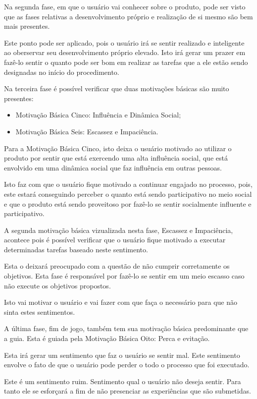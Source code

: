 Na segunda fase, em que o usuário vai conhecer sobre o produto, pode ser visto
que as fases relativas a desenvolvimento próprio e realização de si mesmo
são bem mais presentes.

Este ponto pode ser aplicado, pois o usuário irá se sentir realizado e inteligente
ao oberservar seu desenvolvimento próprio elevado. Isto irá gerar um prazer em fazê-lo
sentir o quanto pode ser bom em realizar as tarefas que a ele estão sendo designadas
no início do procedimento.

Na terceira fase é possível verificar que duas motivações básicas são muito presentes:

\begin{itemize}
    \item Motivação Básica Cinco: Influência e Dinâmica Social;
    \item Motivação Básica Seis: Escassez e Impaciência.
\end{itemize}


Para a Motivação Básica Cinco, isto deixa o usuário motivado ao utilizar o produto
por sentir que está exercendo uma alta influência social, que está envolvido em
uma dinâmica social que faz influência em outras pessoas.

Isto faz com que o usuário fique motivado a continuar engajado no processo, pois,
este estará conseguindo perceber o quanto está sendo participativo no meio social
e que o produto está sendo proveitoso por fazê-lo se sentir socialmente influente
e participativo.


A segunda motivação básica vizualizada nesta fase, Escassez e Impaciência, acontece
pois é possível verificar que o usuário fique motivado a executar determinadas
tarefas baseado neste sentimento.

Esta o deixará preocupado com a questão de não cumprir corretamente os objetivos.
Esta fase é responsável por fazê-lo se sentir em um meio escasso caso não execute
os objetivos propostos.

Isto vai motivar o usuário e vai fazer com que faça o necessário para que não
sinta estes sentimentos.

A última fase, fim de jogo, também tem sua motivação básica predominante que
a guia. Esta é guiada pela Motivação Básica Oito: Perca e evitação.

Esta irá gerar um sentimento que faz o usuário se sentir mal. Este sentimento
envolve o fato de que o usuário pode perder o todo o processo que foi executado.


Este é um sentimento ruim. Sentimento qual o usuário não deseja sentir. Para tanto
ele se esforçará a fim de não presenciar as experiências que são submetidas.

